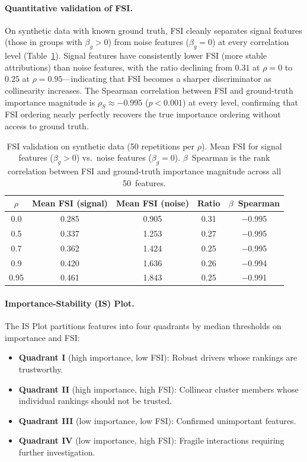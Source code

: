 \documentclass[11pt]{article}
\newcommand{\rhovar}{\rho}
\begin{document}
\paragraph{Quantitative validation of FSI.}
On synthetic data with known ground truth, FSI cleanly separates signal
features (those in groups with $\beta_g > 0$) from noise features
($\beta_g = 0$) at every correlation level (Table~\ref{tab:fsi_validation}).
Signal features have consistently lower FSI (more stable attributions)
than noise features, with the ratio declining from $0.31$ at $\rhovar = 0$
to $0.25$ at $\rhovar = 0.95$---indicating that FSI becomes a sharper
discriminator as collinearity increases. The Spearman correlation between
FSI and ground-truth importance magnitude is $\rhovar_S \approx -0.995$
($p < 0.001$) at every level, confirming that FSI ordering nearly
perfectly recovers the true importance ordering without access to ground
truth.

\begin{table}[htbp]
\centering
\caption{FSI validation on synthetic data (50 repetitions per $\rhovar$).
Mean FSI for signal features ($\beta_g > 0$) vs.\ noise features
($\beta_g = 0$).  $\beta$~Spearman is the rank correlation between FSI
and ground-truth importance magnitude across all 50~features.}
\label{tab:fsi_validation}
\small
\begin{tabular}{ccccc}
\toprule
$\rhovar$ & Mean FSI (signal) & Mean FSI (noise) & Ratio & $\beta$~Spearman \\
\midrule
0.0  & 0.285 & 0.905 & 0.31 & $-$0.995 \\
0.5  & 0.337 & 1.253 & 0.27 & $-$0.995 \\
0.7  & 0.362 & 1.424 & 0.25 & $-$0.995 \\
0.9  & 0.420 & 1.636 & 0.26 & $-$0.994 \\
0.95 & 0.461 & 1.843 & 0.25 & $-$0.991 \\
\bottomrule
\end{tabular}
\end{table}

\paragraph{Importance-Stability (IS) Plot.}
The IS Plot partitions features into four quadrants by median
thresholds on importance and FSI:
\begin{itemize}
  \item \textbf{Quadrant I} (high importance, low FSI): Robust
    drivers whose rankings are trustworthy.
  \item \textbf{Quadrant II} (high importance, high FSI): Collinear
    cluster members whose individual rankings should not be trusted.
  \item \textbf{Quadrant III} (low importance, low FSI): Confirmed
    unimportant features.
  \item \textbf{Quadrant IV} (low importance, high FSI): Fragile
    interactions requiring further investigation.
\end{itemize}
\end{document}
